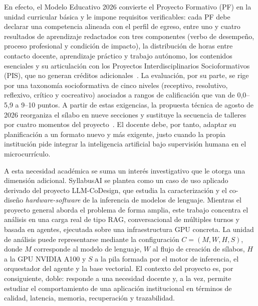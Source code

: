 En efecto, el Modelo Educativo 2026 convierte el Proyecto Formativo (PF) en la unidad curricular básica y le impone requisitos verificables: cada PF debe declarar una competencia alineada con el perfil de egreso, entre uno y cuatro resultados de aprendizaje redactados con tres componentes (verbo de desempeño, proceso profesional y condición de impacto), la distribución de horas entre contacto docente, aprendizaje práctico y trabajo autónomo, los contenidos esenciales y su articulación con los Proyectos Interdisciplinarios Socioformativos (PIS), que no generan créditos adicionales~\cite{uti2026modelo}. La evaluación, por su parte, se rige por una taxonomía socioformativa de cinco niveles (receptivo, resolutivo, reflexivo, crítico y cocreativo) asociados a rangos de calificación que van de 0,0--5,9 a 9--10 puntos. A partir de estas exigencias, la propuesta técnica de agosto de 2026 reorganiza el sílabo en nueve secciones y sustituye la secuencia de talleres por cuatro momentos del proyecto~\cite{uti2026propuesta}. El docente debe, por tanto, adaptar su planificación a un formato nuevo y más exigente, justo cuando la propia institución pide integrar la inteligencia artificial bajo supervisión humana en el microcurrículo.

A esta necesidad académica se suma un interés investigativo que le otorga una dimensión adicional. SyllabusAI se plantea como un caso de uso aplicado derivado del proyecto LLM-CoDesign, que estudia la caracterización y el co-diseño \textit{hardware-software} de la inferencia de modelos de lenguaje. Mientras el proyecto general aborda el problema de forma amplia, este trabajo concentra el análisis en una carga real de tipo RAG, conversacional de múltiples turnos y basada en agentes, ejecutada sobre una infraestructura GPU concreta. La unidad de análisis puede representarse mediante la configuración $C = (M, W, H, S)$, donde $M$ corresponde al modelo de lenguaje, $W$ al flujo de creación de sílabos, $H$ a la GPU NVIDIA A100 y $S$ a la pila formada por el motor de inferencia, el orquestador del agente y la base vectorial. El contexto del proyecto es, por consiguiente, doble: responde a una necesidad docente y, a la vez, permite estudiar el comportamiento de una aplicación institucional en términos de calidad, latencia, memoria, recuperación y trazabilidad.

